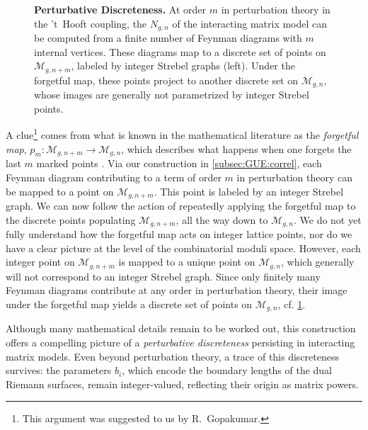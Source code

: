 \documentclass[a4paper,11pt,english]{article}
\theoremstyle{plain}
\theoremstyle{definition}
\theoremstyle{plain}
\newcommand{\M}{\mathcal{M}}
\begin{document}
\begin{figure}[t]
    \caption{
    \textbf{Perturbative Discreteness.} At order $m$ in perturbation theory in the 't~Hooft coupling, the $N_{g,n}$ of the interacting matrix model can be computed from a finite number of Feynman diagrams with $m$ internal vertices. These diagrams map to a discrete set of points on $\M_{g,n+m}$, labeled by integer Strebel graphs (left). Under the forgetful map, these points project to another discrete set on $\M_{g,n}$, whose images are generally not parametrized by integer Strebel points.
    }
    \label{fig:forget}
\end{figure}

A clue\footnote{This argument was suggested to us by R.~Gopakumar.} comes from what is known in the mathematical literature as the \emph{forgetful map}, $p_m \colon \M_{g,n+m} \to \M_{g,n}$, which describes what happens when one forgets the last $m$ marked points \cite{GL26}. Via our construction in \cref{subsec:GUE:correl}, each Feynman diagram contributing to a term of order $m$ in perturbation theory can be mapped to a point on $\M_{g,n+m}$. This point is labeled by an integer Strebel graph. We can now follow the action of repeatedly applying the forgetful map to the discrete points populating $\M_{g,n+m}$, all the way down to $\M_{g,n}$. We do not yet fully understand how the forgetful map acts on integer lattice points, nor do we have a clear picture at the level of the combinatorial moduli space. However, each integer point on $\M_{g,n+m}$ is mapped to a unique point on $\M_{g,n}$, which generally will not correspond to an integer Strebel graph. Since only finitely many Feynman diagrams contribute at any order in perturbation theory, their image under the forgetful map yields a discrete set of points on $\M_{g,n}$, cf. \cref{fig:forget}.

Although many mathematical details remain to be worked out, this construction offers a compelling picture of a \emph{perturbative discreteness} persisting in interacting matrix models. Even beyond perturbation theory, a trace of this discreteness survives: the parameters $b_i$, which encode the boundary lengths of the dual Riemann surfaces, remain integer-valued, reflecting their origin as matrix powers.
\end{document}
